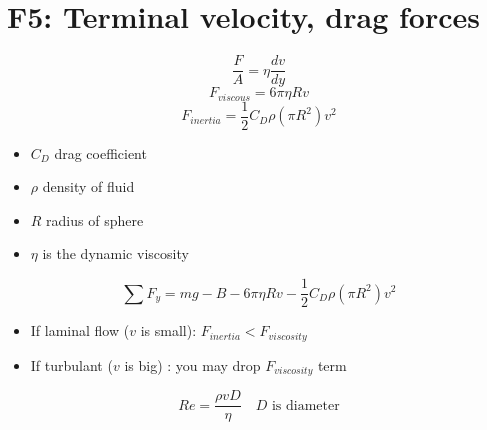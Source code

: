\documentclass{article}
\begin{document}
\newcommand{\hr}{\par\noindent\rule{\textwidth}{0.4pt}}

\newcommand{\bc}[1]{
	\begin{equation*}
		\begin{boxed}
			{#1}
		\end{boxed}
	\end{equation*}
}

\newcommand{\cond}[2]{
	\ifmmode
		{#1} \quad {#2}
	\else
		$$ {#1} \quad {#2} $$
	\fi
}

\newcommand{\matr}[1]{
	\ifmmode \bm{#1}
	\else \textit{\textbf{#1}}
	\fi
}
\newcommand{\vect}[1]{
	\ifmmode \mathbf{#1}
	\else \textbf{#1}
	\fi
}


\section{F5: Terminal velocity, drag forces}

\begin{equation}
	\frac{ F }{ A } = \eta \frac{ dv }{ dy }
\end{equation}
\begin{equation}
	F_{viscous} = 6\pi \eta Rv
\end{equation}
\begin{equation}
	F_{inertia} = \frac{1}{2}C_D\rho \left( \pi R^2 \right) v^2
\end{equation}
\begin{itemize}
	\item $ C_D $ drag coefficient
	\item $ \rho $ density of fluid
	\item $ R $ radius of sphere
	\item $ \eta $ is the dynamic viscosity
\end{itemize}
\begin{equation}
	\sum F_y = mg - B - 6\pi \eta Rv - \frac{1}{2}C_D \rho \left( \pi R^2 \right) v^2
\end{equation}
\begin{itemize}
	\item If laminal flow ($ v $ is small): $ F_{inertia} < F_{viscosity} $
	\item If turbulant ($ v $ is big) : you may drop $ F_{viscosity} $ term
\end{itemize}
\begin{equation}
	Re = \frac{ \rho v D }{ \eta } \quad D \text{ is diameter}
\end{equation}
\end{document}
